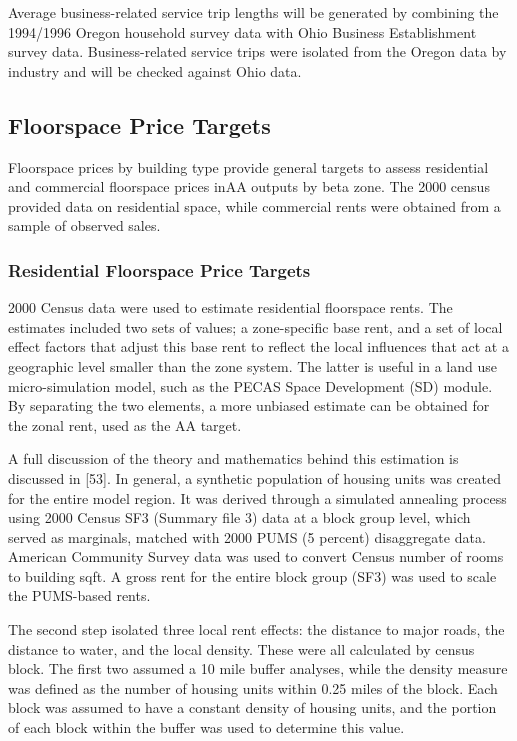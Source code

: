 Average business-related service trip lengths will be generated by combining the 1994/1996 Oregon household survey data with Ohio Business Establishment survey data. Business-related service trips were isolated from the Oregon data by industry and will be checked against Ohio data. 

\subsection{Floorspace Price Targets} 
Floorspace prices by building type provide general targets to assess residential and commercial floorspace prices inAA outputs by beta zone. The 2000 census provided data on residential space, while commercial rents were obtained from a sample of observed sales.  

\subsubsection{Residential Floorspace Price Targets}
2000 Census data were used to estimate residential floorspace rents. The estimates included two sets of values; a zone-specific base rent, and a set of local effect factors that adjust this base rent to reflect the local influences that act at a geographic level smaller than the zone system. The latter is useful in a land use micro-simulation model, such as the PECAS Space Development (SD) module. By separating the two elements, a more unbiased estimate can be obtained for the zonal rent, used as the AA target. 

A full discussion of the theory and mathematics behind this estimation is discussed in [53]. In general, a synthetic population of housing units was created for the entire model region. It was derived through a simulated annealing process using 2000 Census SF3 (Summary file 3) data at a block group level, which served as marginals, matched with 2000 PUMS (5 percent) disaggregate data. American Community Survey data was used to convert Census number of rooms to building sqft. A gross rent for the entire block group (SF3) was used to scale the PUMS-based rents. 

The second step isolated three local rent effects: the distance to major roads, the distance to water, and the local density. These were all calculated by census block. The first two assumed a 10 mile buffer analyses, while the density measure was defined as the number of housing units within 0.25 miles of the block. Each block was assumed to have a constant density of housing units, and the portion of each block within the buffer was used to determine this value. 

